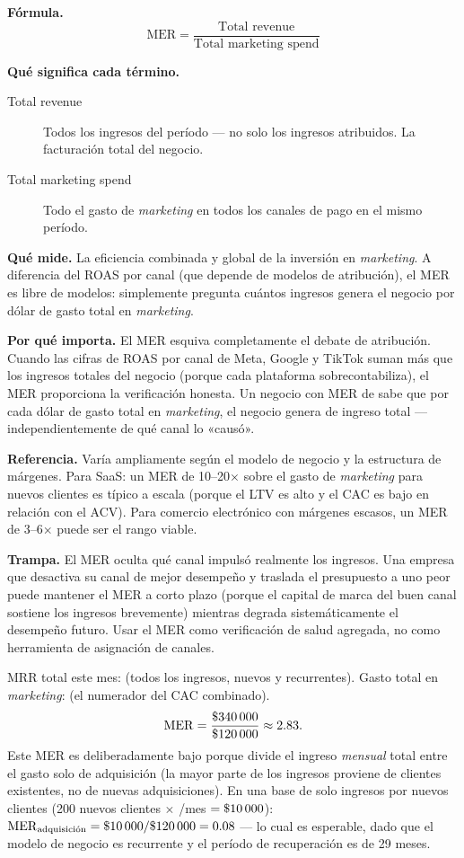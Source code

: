 \textbf{Fórmula.}
\[
  \mathrm{MER} = \frac{\text{Total revenue}}{\text{Total marketing spend}}
\]

\textbf{Qué significa cada término.}
\begin{description}
  \item[Total revenue] Todos los ingresos del período --- no solo los ingresos atribuidos. La
    facturación total del negocio.
  \item[Total marketing spend] Todo el gasto de \emph{marketing} en todos los canales de
    pago en el mismo período.
\end{description}

\textbf{Qué mide.} La eficiencia combinada y global de la inversión en \emph{marketing}.
A diferencia del ROAS por canal (que depende de modelos de atribución), el MER es libre de
modelos: simplemente pregunta cuántos ingresos genera el negocio por dólar de gasto total
en \emph{marketing}.

\textbf{Por qué importa.} El MER esquiva completamente el debate de atribución. Cuando las
cifras de ROAS por canal de Meta, Google y TikTok suman más que los ingresos totales del
negocio (porque cada plataforma sobrecontabiliza), el MER proporciona la verificación
honesta. Un negocio con MER de  sabe que por cada dólar de gasto total en
\emph{marketing}, el negocio genera  de ingreso total --- independientemente de
qué canal lo «causó».

\textbf{Referencia.} Varía ampliamente según el modelo de negocio y la estructura de
márgenes. Para SaaS: un MER de 10--20$\times$ sobre el gasto de \emph{marketing} para nuevos
clientes es típico a escala (porque el LTV es alto y el CAC es bajo en relación con el ACV).
Para comercio electrónico con márgenes escasos, un MER de 3--6$\times$ puede ser el rango
viable.

\textbf{Trampa.} El MER oculta qué canal impulsó realmente los ingresos. Una empresa que
desactiva su canal de mejor desempeño y traslada el presupuesto a uno peor puede mantener el
MER a corto plazo (porque el capital de marca del buen canal sostiene los ingresos
brevemente) mientras degrada sistemáticamente el desempeño futuro. Usar el MER como
verificación de salud agregada, no como herramienta de asignación de canales.

\begin{example}
MRR total este mes:  (todos los ingresos, nuevos y recurrentes). Gasto total
en \emph{marketing}:  (el numerador del CAC combinado).
\[
  \mathrm{MER} = \frac{\$\num{340000}}{\$\num{120000}} \approx 2.83.
\]
Este MER es deliberadamente bajo porque divide el ingreso \emph{mensual} total entre el gasto
solo de adquisición (la mayor parte de los ingresos proviene de clientes existentes, no de
nuevas adquisiciones). En una base de solo ingresos por nuevos clientes (200 nuevos clientes
$\times$ /mes $= \$\num{10000}$): $\mathrm{MER}_\text{adquisición} =
\$\num{10000}/\$\num{120000} = 0.08$ --- lo cual es esperable, dado que el modelo de negocio
es recurrente y el período de recuperación es de 29 meses.
\end{example}


